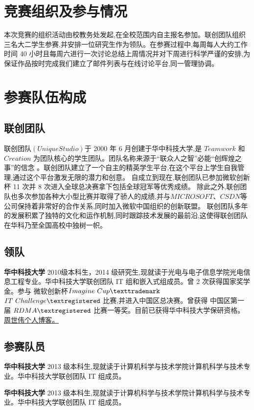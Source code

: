 \documentclass[format=draft,language=chinese,category=SDN]{hustreport}
\begin{document}
\section{竞赛组织及参与情况}
本次竞赛的组织活动由校教务处发起,在全校范围内自主报名参加。联创团队组织三名大二学生参赛,并安排一位研究生作为领队。在参赛过程中,每周每人大约工作时间 40 小时且每周六进行一次讨论总结上周情况并对下周进行科学严谨的安排,为保证作品按时完成我们建立了邮件列表与在线讨论平台,同一管理协调。
\section{参赛队伍构成}
\subsection{联创团队}
联创团队$(Unique Studio)$于 2000 年 6 月创建于华中科技大学,是 $Teamwork$ 和
 $Creation$ 为团队核心的学生团队。团队名称来源于“联众人之智”必能“创辉煌之事”的信念
。联创团队建立了一个自主的精英学生平台,在这个平台上学生自我管理,通过这个平台激发无限的潜力和创意。
自成立到现在,联创团队已参加微软创新杯 11 次并 8 次进入全球总决赛拿下包括全球冠军等优秀成绩。
除此之外,联创团队也多次参加各种大小型比赛并取得了骄人的成绩,并与$MICROSOFT$\texttrademark、$CSDN$\texttrademark 等公司保持着非常好的合作关系,同时加入微软中国组织的创新联盟。
联创团队多年的发展积累了独特的文化和运作机制,同时跟踪技术发展的最前沿,这使得联创团队在华科乃至全国高校中独树一帜。
\subsection{领队}

\textbf{华中科技大学} 2010级本科生，2014 级研究生,现就读于光电与电子信息学院光电信息工程专业。华中科技大学联创团队 IT 组和嵌入式组成员。曾 2 次获得国家奖学金。参与 微软创新杯$Imagine~Cup\texttrademark$ $IT~Challenge\textregistered$ 比赛,并进入中国区总决赛。曾获得
中国区第一届 $RDMA\textregistered$ 比赛一等奖。目前已获得华中科技大学保研资格。
\href{http://zhoushiwei1992.blog.163.com}{周世伟个人博客。}
\subsection{参赛队员}

\textbf{华中科技大学} 2013 级本科生,现就读于计算机科学与技术学院计算机科学与技术专业。华中科技大学联创团队 IT 组成员。


\textbf{华中科技大学} 2013 级本科生,现就读于计算机科学与技术学院计算机科学与技术专业。华中科技大学联创团队 IT 组成员。
\end{document}
